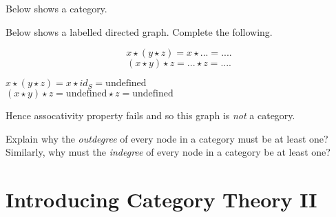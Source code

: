 \frmrule

\begin{example}
Below shows a category. 
\end{example}

\frmrule


\begin{example}
Below shows a labelled directed graph.
Complete the following.
\begin{figure}[h]
\end{figure}
\end{example}

$$x \star (y \star z) = x \star ... = ....$$
$$(x \star y) \star z = ... \star z = ....$$


\frameans{}
{
$x \star (y \star z) = x \star id_S = \text{undefined}$\\
$(x \star y) \star z = \text{undefined} \star z = \text{undefined}$ 
}


Hence assocativity property fails and so
this graph is \textit{not} a category. 


\frmrule


\begin{example}
Explain why the \textit{outdegree} of every node in a category 
must be at least one? Similarly, why must the \textit{indegree} 
of every node in a category be at least one?
\end{example}


\begin{example}
\end{example}



\section{Introducing Category Theory II}


